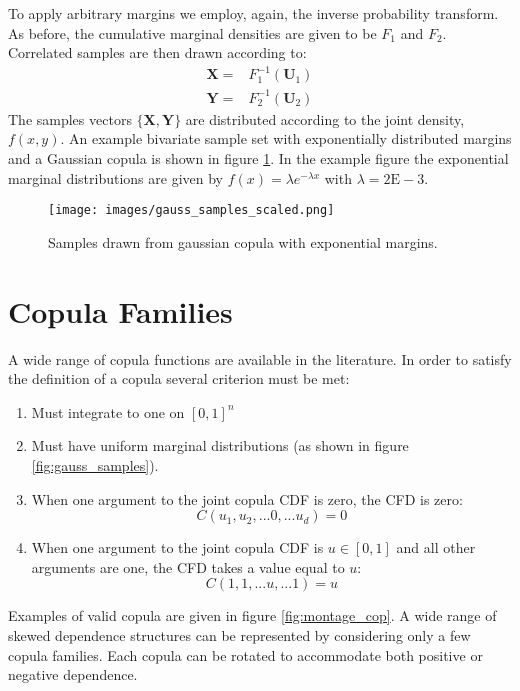 To apply arbitrary margins we employ, again, the inverse probability transform.  As before, the cumulative marginal densities are given to be $F_1$ and $F_2$.
Correlated samples are then drawn according to:
\begin{eqnarray}
\mathbf X = & F_1^{-1}(\mathbf U_1) \\
\mathbf Y = & F_2^{-1}(\mathbf U_2)
\end{eqnarray}
The samples vectors $\{\mathbf X, \mathbf Y\}$ are distributed according to the joint density, $f(x,y)$.  An example bivariate sample set with exponentially distributed margins and a Gaussian copula is shown in figure \ref{fig:gauss_samples_scaled}.  In the example figure the exponential marginal distributions are given by $f(x)=\lambda e^{-\lambda x}$ with $\lambda=2\mathrm{E-}3$.

\begin{figure}[!htbp]
	\centering
	\texttt{[image: images/gauss\_samples\_scaled.png]}
	\caption{Samples drawn from gaussian copula with exponential margins.}
	\label{fig:gauss_samples_scaled}
\end{figure}


\section*{Copula Families}

A wide range of copula functions are available in the literature.  In order to satisfy the definition of a copula several criterion must be met:
\begin{enumerate}
	\item Must integrate to one on $[0, 1]^n$
	\item Must have uniform marginal distributions (as shown in figure \ref{fig:gauss_samples}).
	\item When one argument to the joint copula CDF is zero, the CFD is zero:
	\begin{equation}
	C(u_1, u_2, ... 0, ... u_d) = 0
	\end{equation}
	\item When one argument to the joint copula CDF is $u\in[0,1]$ and all other arguments are one, the CFD takes a value equal to $u$:
	\begin{equation}
	C(1, 1, ... u, ... 1) = u
	\end{equation}
\end{enumerate}

Examples of valid copula are given in figure \ref{fig:montage_cop}.  A wide range of skewed dependence structures can be represented by considering only a few copula families.  Each copula can be rotated to accommodate both positive or negative dependence.

